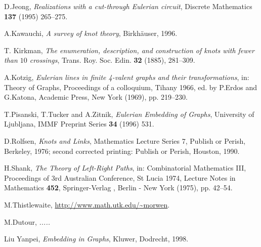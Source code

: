\documentclass[12pt]{article}
\begin{document}
\begin{thebibliography}{99}
D.Jeong, {\em Realizations with a cut-through Eulerian circuit},
Discrete Mathematics {\bf 137} (1995) 265--275.



A.Kawauchi, {\em A survey of knot theory}, Birkh\"{a}user, 1996.

T. Kirkman, {\em The enumeration, description, and construction of knots with fewer than $10$ crossings}, Trans. Roy. Soc. Edin. {\bf 32} (1885), 281--309.


A.Kotzig, {\em Eulerian lines in finite 4-valent graphs and their 
transformations}, in: Theory of Graphs, Proceedings of a colloquium, 
Tihany 1966, ed. by P.Erdos and G.Katona, Academic Press, 
New York (1969), pp. 219--230.


T.Pisanski, T.Tucker and A.Zitnik, {\em Eulerian Embedding of Graphs},
University of Ljubljana, IMMF Preprint Series {\bf 34}
(1996) 531.

D.Rolfsen, {\em Knots and Links}, Mathematics Lecture Series 7, Publish or
Perish, Berkeley, 1976;
second corrected printing: Publish or Perish, Houston, 1990.

H.Shank, {\em The Theory of Left-Right Paths}, in: Combinatorial 
Mathematics III,
Proceedings of 3rd Australian Conference, St Lucia 1974, Lecture Notes in
Mathematics {\bf 452}, Springer-Verlag , Berlin - New York (1975),  pp. 42--54.

M.Thistlewaite, \url{http://www.math.utk.edu/~morwen}.

M.Dutour, {\em .....}

Liu Yanpei, {\em Embedding in Graphs}, Kluwer, Dodrecht, 1998.



 
\end{thebibliography}
\end{document}
